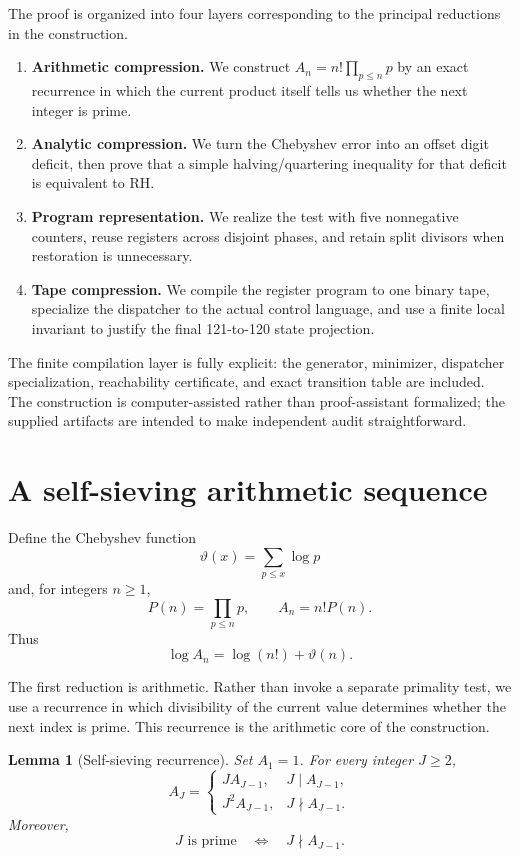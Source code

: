 \documentclass[10pt]{article}
\newtheorem{lemma}[theorem]{Lemma}
\theoremstyle{definition}
\newcommand{\tht}{\vartheta}
\begin{document}
The proof is organized into four layers corresponding to the principal
reductions in the construction.
\begin{enumerate}[label=(\roman*)]
\item \textbf{Arithmetic compression.} We construct $A_n=n!\prod_{p\le n}p$ by
an exact recurrence in which the current product itself tells us whether the
next integer is prime.
\item \textbf{Analytic compression.} We turn the Chebyshev error into an
offset digit deficit, then prove that a simple halving/quartering inequality
for that deficit is equivalent to RH.
\item \textbf{Program representation.} We realize the test with five
nonnegative counters, reuse registers across disjoint phases, and retain split
divisors when restoration is unnecessary.
\item \textbf{Tape compression.} We compile the register program to one binary
tape, specialize the dispatcher to the actual control language, and use a
finite local invariant to justify the final 121-to-120 state projection.
\end{enumerate}

The finite compilation layer is fully explicit: the generator, minimizer,
dispatcher specialization, reachability certificate, and exact transition
table are included. The construction is computer-assisted rather than
proof-assistant formalized; the supplied artifacts are intended to make
independent audit straightforward.

\section{A self-sieving arithmetic sequence}

Define the Chebyshev function
\[
\tht(x)=\sum_{p\le x}\log p
\]
and, for integers $n\ge1$,
\[
P(n)=\prod_{p\le n}p,
\qquad
A_n=n!P(n).
\]
Thus
\begin{equation}
\label{eq:logA}
\log A_n=\log(n!)+\tht(n).
\end{equation}

The first reduction is arithmetic. Rather than invoke a separate primality
test, we use a recurrence in which divisibility of the current value
determines whether the next index is prime. This recurrence is the arithmetic
core of the construction.

\begin{lemma}[Self-sieving recurrence]
\label{lem:selfsieve}
Set $A_1=1$. For every integer $J\ge2$,
\begin{equation}
\label{eq:selfsieve}
A_J=
\begin{cases}
J A_{J-1},&J\mid A_{J-1},\\
J^2A_{J-1},&J\nmid A_{J-1}.
\end{cases}
\end{equation}
Moreover,
\[
J\text{ is prime}\quad\Longleftrightarrow\quad J\nmid A_{J-1}.
\]
\end{lemma}
\end{document}
